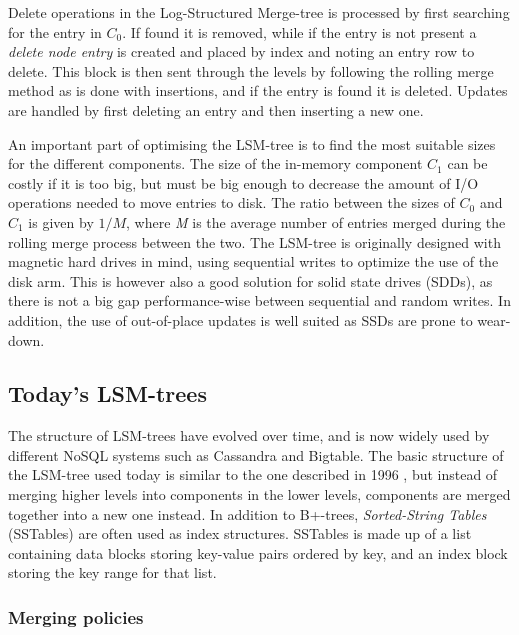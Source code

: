 \noindent
Delete operations in the Log-Structured Merge-tree is processed by first searching for the entry in $C_0$. If found it is removed, while if the entry is not present a \emph{delete node entry} is created and placed by index and noting an entry row to delete. This block is then sent through the levels by following the rolling merge method as is done with insertions, and if the entry is found it is deleted. Updates are handled by first deleting an entry and then inserting a new one.
\newline

\noindent
An important part of optimising the LSM-tree is to find the most suitable sizes for the different components. The size of the in-memory component $C_1$ can be costly if it is too big, but must be big enough to decrease the amount of I/O operations needed to move entries to disk. The ratio between the sizes of $C_0$ and $C_1$ is given by $1/M$, where \emph{M} is the average number of entries merged during the rolling merge process between the two. The LSM-tree is originally designed with magnetic hard drives in mind, using sequential writes to optimize the use of the disk arm. This is however also a good solution for solid state drives (SDDs), as there is not a big gap performance-wise between sequential and random writes. In addition, the use of out-of-place updates is well suited as SSDs are prone to wear-down\cite{LSMSDD}.

\subsection{Today's LSM-trees}
The structure of LSM-trees have evolved over time, and is now widely used by different NoSQL systems such as Cassandra\cite{Cassandra} and Bigtable\cite{Bigtable}. The basic structure of the LSM-tree used today is similar to the one described in 1996 \cite{LSMTree}, but instead of merging higher levels into components in the lower levels, components are merged together into a new one instead\cite{LSMSurvey}. In addition to B+-trees, \emph{Sorted-String Tables} (SSTables) are often used as index structures. SSTables is made up of a list containing data blocks storing key-value pairs ordered by key, and an index block storing the key range for that list. 

\subsubsection{Merging policies}

